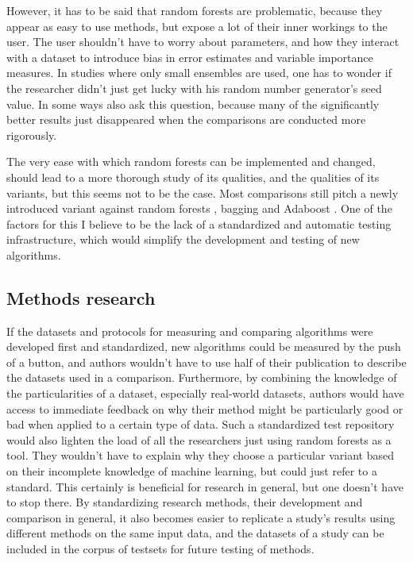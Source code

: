\documentclass[a4paper,man,12pt,apacite,floatsintext,draftfirst]{apa6} %
\begin{document}
However, it has to be said that random forests are problematic,
because they appear as easy to use methods, but expose a lot of their
inner workings to the user.
The user shouldn't have to worry about parameters, and how they interact
with a dataset to introduce bias in error estimates and
variable importance measures.
In studies where only small ensembles are used, one has to wonder if the
researcher didn't just get lucky with his random number generator's seed value.
In some ways \cite{banfield2007comparison} also ask this question,
because many of the significantly better results just disappeared when
the comparisons are conducted more rigorously.

The very ease with which random forests can be implemented and changed,
should lead to a more thorough study of its qualities,
and the qualities of its variants, but this seems not to be the case.
Most comparisons still pitch a newly introduced variant against random forests
\cite{breiman2001random}, bagging \cite{breiman1996bagging}
and Adaboost \cite{freund1995decision}.
One of the factors for this I believe to be the lack of a standardized
and automatic testing infrastructure, which would simplify the development
and testing of new algorithms.

\subsection{Methods research}
If the datasets and protocols for measuring and comparing algorithms were
developed first and standardized, new algorithms could be measured by the
push of a button, and authors wouldn't have to use half of their publication
to describe the datasets used in a comparison.
Furthermore, by combining the knowledge of the particularities of a dataset,
especially real-world datasets, authors would have access to immediate
feedback on why their method might be particularly good or bad when applied
to a certain type of data.
Such a standardized test repository would also lighten the load of all the
researchers just using random forests as a tool.
They wouldn't have to explain why they choose a particular variant based on
their incomplete knowledge of machine learning, but could just refer to
a standard.
This certainly is beneficial for research in general, but one doesn't have
to stop there.
By standardizing research methods, their development and comparison
in general, it also becomes easier to replicate a study's results using
different methods on the same input data, and the datasets of a study can
be included in the corpus of testsets for future testing of methods.
\end{document}
